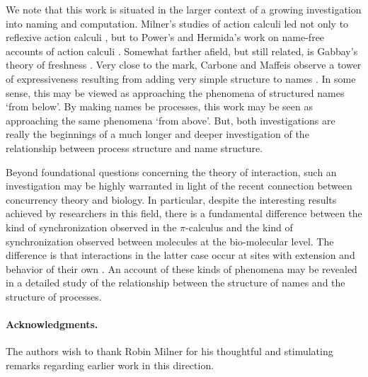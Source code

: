 \documentclass[]{amsart}
\theoremstyle{definition}
\theoremstyle{remark}
\numberwithin{equation}{subsection}
\newcommand{\pic}{$\pi$-calculus}
\begin{document}
We note that this work is situated in the larger context of a growing
investigation into naming and computation. Milner's studies of action
calculi led not only to reflexive action calculi
\cite{DBLP:conf/tacs/Milner97}, but to Power's and Hermida's work on
name-free accounts of action calculi
\cite{DBLP:conf/concur/HermidaP95}. Somewhat farther afield, but still
related, is Gabbay's theory of freshness \cite{GabbayMJ:picfm}. Very
close to the mark, Carbone and Maffeis observe a tower of
expressiveness resulting from adding very simple structure to names
\cite{polysync}. In some sense, this may be viewed as approaching the
phenomena of structured names `from below'. By making names be
processes, this work may be seen as approaching the same phenomena
`from above'. But, both investigations are really the beginnings of a
much longer and deeper investigation of the relationship between
process structure and name structure.

Beyond foundational questions concerning the theory of interaction,
such an investigation may be highly warranted in light of the recent
connection between concurrency theory and biology. In particular,
despite the interesting results achieved by researchers in this field,
there is a fundamental difference between the kind of synchronization
observed in the {\pic} and the kind of synchronization observed
between molecules at the bio-molecular level. The difference is that
interactions in the latter case occur at sites with extension and
behavior of their own \cite{Fontana}. An account of these kinds of
phenomena may be revealed in a detailed study of the relationship
between the structure of names and the structure of processes.

\paragraph{Acknowledgments.}
The authors wish to thank Robin Milner for his thoughtful and stimulating
remarks regarding earlier work in this direction.





\end{document}
